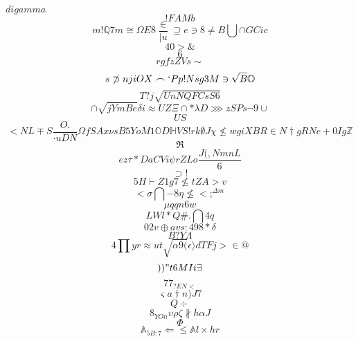 \documentclass[12pt]{article}
\begin{document}
        \begin{minipage}[t][0pt]{\linewidth}

        $digamma$
\[!FAMb\]
\[m!\mathbb{Q} 7 m\cong\Omega E 8\frac{\in}{\mid u}\supseteq e\ni 8\neq B\bigcup\cap G C i c\]
\[40>\&\]
\[6\]
\[rgfzZVs\sim\]
\[s\not\supset n j i O X\frown ` P p ! N s g 3 M\ni\sqrt{B}\mathbb{O}\]
\[T?j\sqrt{UnNQFCsS6}\]
\[\cap\sqrt{jYmBe}\delta i\approx U Z\Xi\cap *\lambda D\ggg z S {Ps}\neg 9\cup\]
\[US\]
\[<NL\mp S\frac{O.}{\cdot u D N}\Omega f S A x\nu s B 5 Y o M 1\mathbb{O} D {\mathbb{H} V S ! r k}\emptyset J\chi\nleq w g i X B R\in {N}\dagger g R N e + 0 I g\mathbb{Z}\]
\[\Re\]
\[ez\tau * D a C V i\psi r Z L o\frac{J(,NmnL}{6}\]
\[\supset !\]
\[5H\vdash Z 1 g 7\nleq t Z A > v\]
\[<\sigma\bigcap - 8\eta\nleq < ;^{\Delta m}\]
\[\mu q q n 6 w\]
\[LWl*Q\# .\bigcap 4 q\]
\[0 {2v}\oplus a v s : 4 9 8 {*}\delta\]
\[B?Y\Lambda\]
\[4\prod y r\approx u t\sqrt{\alpha 9 (}\epsilon\rangle d T F j >\in @\]
\[))"t6MIi\exists\]
\[77_{?EN<}\]
\[\varsigma a\dagger n ) J 7\]
\[Q\div\]
\[8_{YOn}\upsilon\rho\zeta\nparallel h\alpha J\]
\[\Phi\]
\[\mathbb{A}_{5B:7}\Leftarrow\leq\mathbb{A} l\times h r
        \]
\end{minipage}
\end{document}
